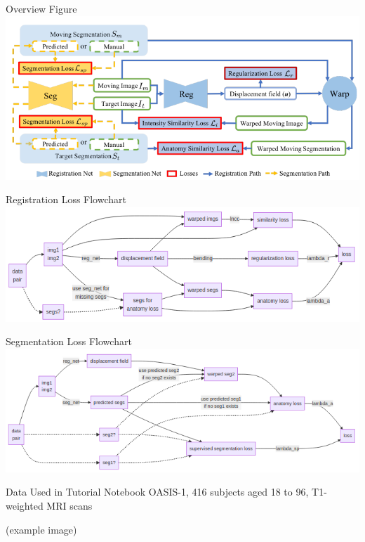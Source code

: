 \documentclass[10pt,aspectratio=169,dvipsnames]{beamer}
\begin{document}
\begin{frame}{Overview Figure}
\includegraphics[scale=0.65]{figures/deepatlas-paper-fig.png}
\end{frame}

\begin{frame}{Registration Loss Flowchart}
\includegraphics[scale=0.75]{figures/reg_loss_flowchart.png}
\end{frame}

\begin{frame}{Segmentation Loss Flowchart}
\includegraphics[scale=0.75]{figures/seg_loss_flowchart.png}
\end{frame}

\begin{frame}{Data Used in Tutorial Notebook}
OASIS-1, 416 subjects aged 18 to 96, T1-weighted MRI scans

\begin{center}
(example image)
\end{center}

\vfill

\end{frame}
\end{document}
